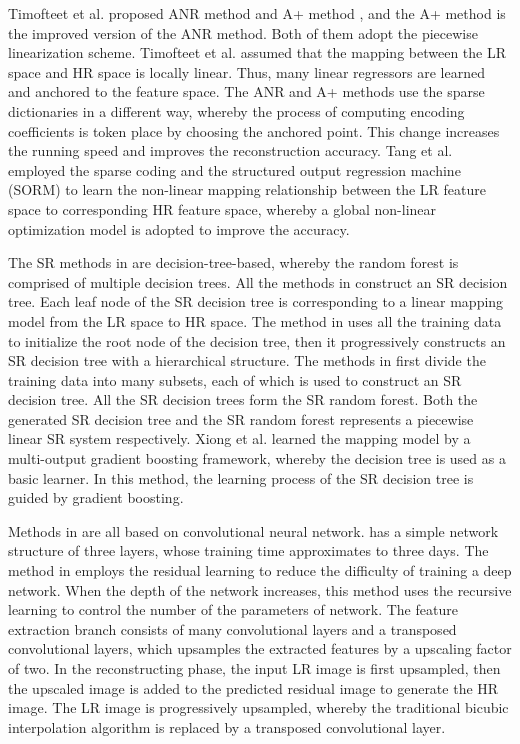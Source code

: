 \documentclass[review,numbers,sort&compress]{elsarticle}  %
\begin{document}
Timofteet et al. proposed  ANR method \cite{timofte2013anchored} and A+ method \cite{timofte2014a+}, and the A+ method is the improved version of the ANR method. Both of them adopt the piecewise linearization scheme. Timofteet et al. assumed that the mapping between the LR space and HR space is locally linear. Thus, many linear regressors are learned and anchored to the feature space. The ANR and A+ methods use the sparse dictionaries in a different way, whereby the process of computing encoding coefficients is token place by choosing the anchored point. This change increases the running speed and improves the reconstruction accuracy. Tang et al. employed the sparse coding and the structured output regression machine (SORM) to learn the non-linear mapping relationship between the LR feature space to corresponding HR feature space, whereby a global non-linear optimization model is adopted to improve the accuracy.

The SR methods in \cite{huang2017learning} \cite{huang2015practical} \cite{huang2015fast} \cite{schulter2015fast} \cite{xiong2018gradient}are decision-tree-based, whereby the random forest is comprised of multiple decision trees. All the methods in\cite{huang2017learning}\cite{huang2015practical}\cite{huang2015fast}\cite{schulter2015fast} construct an SR decision tree. Each leaf node of the SR decision tree is corresponding to a linear mapping model from the LR space to HR space. The method in \cite{huang2017learning} uses all the training data to initialize the root node of the decision tree, then it progressively constructs an SR decision tree with a hierarchical structure. The methods in \cite{huang2015practical}\cite{huang2015fast}\cite{schulter2015fast} first divide the training data into many subsets, each of which is used to construct an SR decision tree. All the SR decision trees form the SR random forest. Both the generated SR decision tree and the SR random forest represents a piecewise linear SR system respectively. Xiong et al. learned the mapping model by a multi-output gradient boosting framework, whereby the decision tree is used as a basic learner. In this method, the learning process of the SR decision tree is guided by gradient boosting.

Methods in \cite{dong2016image}\cite{lai2017deep}\cite{tai2017image} are all based on convolutional neural network. \cite{dong2016image} has a simple network structure of three layers, whose training time approximates to three days. The method in \cite{tai2017image} employs the residual learning to reduce the difficulty of training a deep network. When the depth of the network increases, this method uses the recursive learning to control the number of the parameters of network. The feature extraction branch consists of many convolutional layers and a transposed convolutional layers, which upsamples the extracted features by a upscaling factor of two. In the reconstructing phase, the input LR image is first upsampled, then the upscaled image is added to the predicted residual image to generate the HR image. The LR image is progressively upsampled, whereby the traditional bicubic interpolation algorithm is replaced by a transposed convolutional layer.
\end{document}
